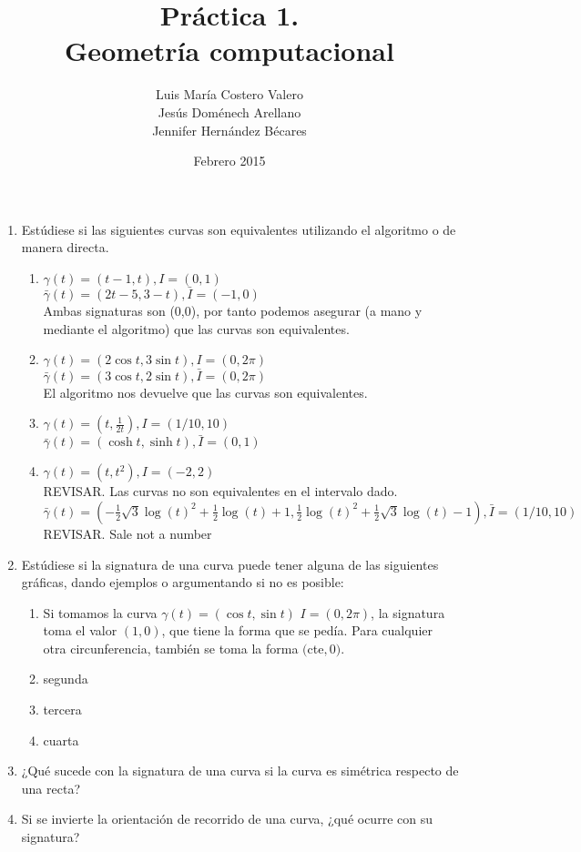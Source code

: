 \documentclass{article}
\title{Práctica 1. \\ Geometría computacional}
\author{Luis María Costero Valero \\ Jesús Doménech Arellano \\ Jennifer Hernández Bécares}
\date{Febrero 2015}
\begin{document}
\maketitle

\begin{enumerate}
\item Estúdiese si las siguientes curvas son equivalentes utilizando el algoritmo o de manera directa. 
\begin{enumerate}
\item $\gamma(t)=(t-1,t),I=(0,1)$ \\ $\bar{\gamma}(t)=(2t-5,3-t),\bar{I}=(-1,0)$ \\
Ambas signaturas son (0,0), por tanto podemos asegurar (a mano y mediante el algoritmo) que las curvas son equivalentes.
\item $\gamma(t)=(2\cos t,3\sin t),I=(0,2\pi)$ \\ $\bar{\gamma}(t)=(3\cos t,2\sin t),\bar{I}=(0,2\pi)$ \\
El algoritmo nos devuelve que las curvas son equivalentes. 
\item $\gamma(t)=(t,\frac{1}{2t}),I=(1/10, 10)$ \\ $\bar{\gamma}(t)=(\cosh t,\sinh t),\bar{I}=(0,1)$ \\
\item $\gamma(t)=(t,t^{2}),I=(-2,2)$ \\
REVISAR. Las curvas no son equivalentes en el intervalo dado. 
$\bar{\gamma}(t)=(-\frac{1}{2}\sqrt{3}\log(t)^{2}+\frac{1}{2}\log(t)+1,\frac{1}{2}\log(t)^{2}+\frac{1}{2}\sqrt{3}\log(t)-1),\bar{I}=(1/10,10)$ \\
REVISAR. Sale not a number
\end{enumerate}

\item Estúdiese si la signatura de una curva puede tener alguna de las siguientes gráficas, dando ejemplos o argumentando si no es posible:
\begin{enumerate}[label=\roman*]
\item Si tomamos la curva $\gamma(t)=(\cos t, \sin t)$ $I=(0,2\pi)$, la signatura toma el valor $(1,0)$, que tiene la forma que se pedía. Para cualquier otra circunferencia, también se toma la forma $($cte$,0)$.   
\item segunda
\item tercera
\item cuarta
\end{enumerate}

\item ¿Qué sucede con la signatura de una curva si la curva es simétrica respecto de una recta?

\item Si se invierte la orientación de recorrido de una curva, ¿qué ocurre con su signatura?
\end{enumerate}
\end{document}
